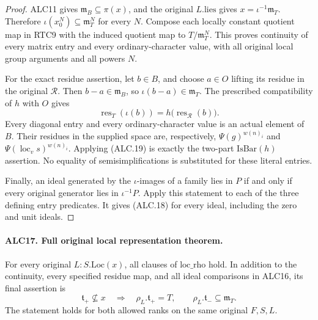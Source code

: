 \begin{proof}
ALC11 gives \(\mathfrak m_B\subseteq\pi(x)\), and the
original \(L.\mathrm{lies}\) gives
\(x=\iota^{-1}\mathfrak m_T\).  Therefore
\(\iota(x_0^N)\subseteq\mathfrak m_T^N\) for every
\(N\).  Compose each locally constant quotient map in
RTC9 with the induced quotient map to
\(T/\mathfrak m_T^N\).  This proves continuity of every
matrix entry and every ordinary-character value, with all
original local group arguments and all powers \(N\).

For the exact residue assertion, let \(b\in B\), and
choose \(a\in O\) lifting its residue in the original
\(\mathcal R\).  Then \(b-a\in\mathfrak m_B\), so
\(\iota(b-a)\in\mathfrak m_T\).  The prescribed
compatibility of \(h\) with \(O\) gives
\[
 \operatorname{res}_T(\iota(b))
       =h\bigl(\operatorname{res}_{\mathcal R}(b)\bigr).
                                                        \tag{ALC.19}
\]
Every diagonal entry and every ordinary-character value is
an actual element of \(B\).  Their residues in the supplied
space are, respectively, \(\Psi(g)^{w(n)_i}\) and
\(\Psi(\operatorname{loc}_v s)^{w(n)_i}\).
Applying (ALC.19) is exactly the two-part
\(\mathrm{IsBar}(h)\) assertion.  No equality of
semisimplifications is substituted for these literal entries.

Finally, an ideal generated by the \(\iota\)-images of
a family lies in \(P\) if and only if every original
generator lies in \(\iota^{-1}P\).  Apply this statement
to each of the three defining entry predicates.  It gives
(ALC.18) for every ideal, including the zero and unit ideals.
\end{proof}

\paragraph{ALC17. Full original local representation theorem.}
\label{claim:ALC17}
For every original \(L:S.\mathrm{Loc}(x)\), all clauses
of \(\mathrm{loc\_rho}\) hold.  In addition to the
continuity, every specified residue map, and all ideal
comparisons in ALC16, its final assertion is
\[
 \mathfrak t_+\not\subseteq x
 \quad\Longrightarrow\quad
 \rho_L.\mathfrak t_+=T,
 \qquad \rho_L.\mathfrak t_-\subseteq\mathfrak m_T.
                                                        \tag{ALC.20}
\]
The statement holds for both allowed ranks on the same
original \(F,S,L\).

